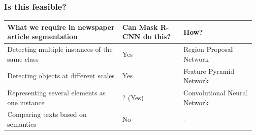 \documentclass[aspectratio=1610]{beamer}
\begin{document}
\normalpage

\begin{frame}
  \frametitle{Is this feasible?}


\begin{center}
\begin{tabular}{ |m{15em}|m{5em}|m{15em}| } 
 \hline
 What we require in newspaper article segmentation & Can Mask R-CNN do this? & How? \\ 
 \hline
 Detecting multiple instances of the same class & Yes & Region Proposal Network \\ 
 Detecting objects at different scales & Yes & Feature Pyramid Network \\ 
 Representing several elements as one instance & ? (Yes) & Convolutional Neural Network \\ 
 Comparing texts based on semantics & No & - \\ 
 \hline
\end{tabular}
\end{center}

\end{frame}
\end{document}
